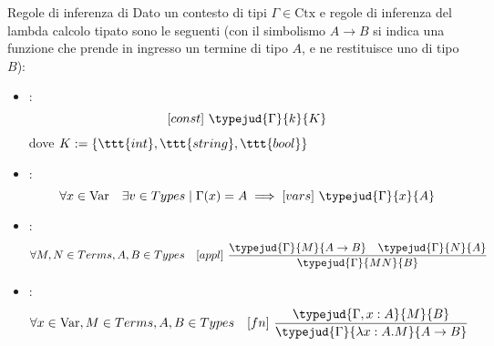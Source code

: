 \documentclass[a4paper, 12pt]{report}
\begin{document}
    \begin{framedprop}{Regole di inferenza di }
        Dato un contesto di tipi $\Gamma \in \mathrm{Ctx}$ e regole di inferenza del lambda calcolo tipato sono le seguenti (con il simbolismo $A \to B$ si indica una funzione che prende in ingresso un termine di tipo $A$, e ne restituisce uno di tipo $B$):

        \begin{itemize}
            \item {}: $$[const] \ \typejud{\Gamma}{k}{K}$$ dove $K := \{\ttt{int}, \ttt{string}, \ttt{bool}\}$
            \item {}: $$\forall x \in \mathrm{Var} \quad \exists v \in Types \mid \Gamma(x) = A \implies [vars] \ \typejud{\Gamma}{x}{A}$$
            \item {}: $$\forall M,N \in Terms, A,B \in Types \quad [appl] \ \dfrac{\typejud{\Gamma}{M}{A \to B} \quad \typejud{\Gamma}{N}{A}}{\typejud{\Gamma}{MN}{B}}$$
            \item {}: $$\forall x \in \mathrm{Var}, M \in Terms, A,B \in Types \quad [fn] \ \dfrac{\typejud{\Gamma,x:A}{M}{B}}{\typejud{\Gamma}{\lambda x: A.M}{A \to B}}$$
        \end{itemize}
    \end{framedprop}
\end{document}
